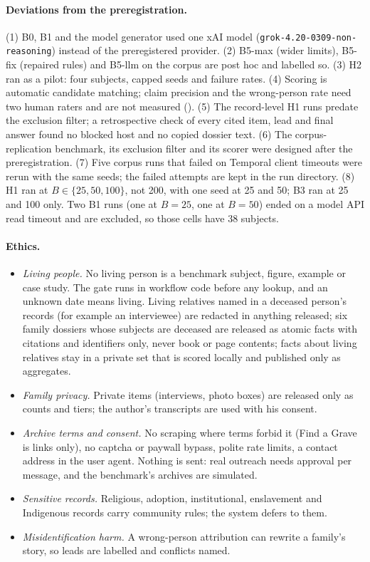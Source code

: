 \paragraph{Deviations from the preregistration.} (1) B0, B1 and the model generator used one xAI model (\texttt{grok-4.20-0309-non-reasoning}) instead of the preregistered provider. (2) B5-max (wider limits), B5-fix (repaired rules) and B5-llm on the corpus are post hoc and labelled so. (3) H2 ran as a pilot: four subjects, capped seeds and failure rates. (4) Scoring is automatic candidate matching; claim precision and the wrong-person rate need two human raters and are not measured (\NM). (5) The record-level H1 runs predate the exclusion filter; a retrospective check of every cited item, lead and final answer found no blocked host and no copied dossier text. (6) The corpus-replication benchmark, its exclusion filter and its scorer were designed after the preregistration. (7) Five corpus runs that failed on Temporal client timeouts were rerun with the same seeds; the failed attempts are kept in the run directory. (8) H1 ran at $B\in\{25,50,100\}$, not 200, with one seed at 25 and 50; B3 ran at 25 and 100 only. Two B1 runs (one at $B=25$, one at $B=50$) ended on a model API read timeout and are excluded, so those cells have 38 subjects.

\paragraph{Ethics.}
\begin{itemize}
\item \emph{Living people.} No living person is a benchmark subject, figure, example or case study. The gate runs in workflow code before any lookup, and an unknown date means living. Living relatives named in a deceased person's records (for example an interviewee) are redacted in anything released; six family dossiers whose subjects are deceased are released as atomic facts with citations and identifiers only, never book or page contents; facts about living relatives stay in a private set that is scored locally and published only as aggregates.
\item \emph{Family privacy.} Private items (interviews, photo boxes) are released only as counts and tiers; the author's transcripts are used with his consent.
\item \emph{Archive terms and consent.} No scraping where terms forbid it (Find a Grave is links only), no captcha or paywall bypass, polite rate limits, a contact address in the user agent. Nothing is sent: real outreach needs approval per message, and the benchmark's archives are simulated.
\item \emph{Sensitive records.} Religious, adoption, institutional, enslavement and Indigenous records carry community rules; the system defers to them.
\item \emph{Misidentification harm.} A wrong-person attribution can rewrite a family's story, so leads are labelled and conflicts named.
\end{itemize}
